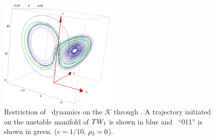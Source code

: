 \begin{figure}[ht]
\begin{center}
\includegraphics[width=0.5\textwidth, clip=true]{../figs/CLEtransvRPO}
\end{center}
\caption[\CLe\ desymmetrization with transverse integration II]{
Restriction of \CLe\ dynamics on the {\slice} $\mathcal{K}$ through
. A trajectory initiated on the unstable
manifold of $TW_{1}$ is shown in blue and \rpo\ ``011'' is shown
in green.
($e=1/10$, $\rho_2=0$).
    }
\label{fig:CLEtransvII}
\end{figure}
